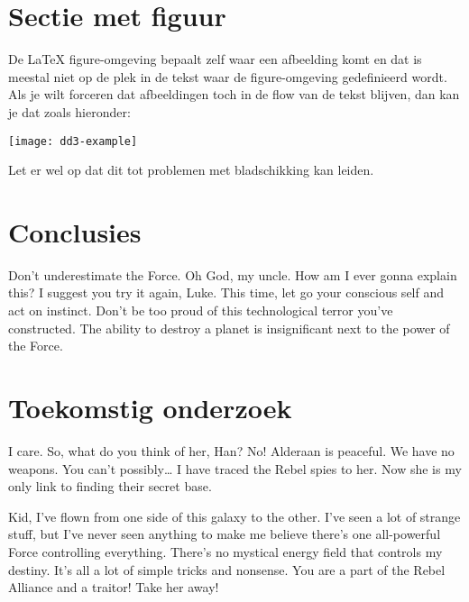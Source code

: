 \documentclass[english,a0,portrait]{hogent-poster}
\begin{document}
\begin{multicols}{2}
\section{Sectie met figuur}

De {\LaTeX} figure-omgeving bepaalt zelf waar een afbeelding komt en dat is meestal niet op de plek in de tekst waar de figure-omgeving gedefinieerd wordt. Als je wilt forceren dat afbeeldingen toch in de flow van de tekst blijven, dan kan je dat zoals hieronder:

\begin{center}
  \captionsetup{type=figure}
  \texttt{[image: dd3-example]}
\end{center}

Let er wel op dat dit tot problemen met bladschikking kan leiden.

\section{Conclusies}

Don't underestimate the Force. Oh God, my uncle. How am I ever gonna explain this? I suggest you try it again, Luke. This time, let go your conscious self and act on instinct. Don't be too proud of this technological terror you've constructed. The ability to destroy a planet is insignificant next to the power of the Force.

\section{Toekomstig onderzoek}

I care. So, what do you think of her, Han? No! Alderaan is peaceful. We have no weapons. You can't possibly… I have traced the Rebel spies to her. Now she is my only link to finding their secret base.

Kid, I've flown from one side of this galaxy to the other. I've seen a lot of strange stuff, but I've never seen anything to make me believe there's one all-powerful Force controlling everything. There's no mystical energy field that controls my destiny. It's all a lot of simple tricks and nonsense. You are a part of the Rebel Alliance and a traitor! Take her away! 

\end{multicols}
\end{document}

